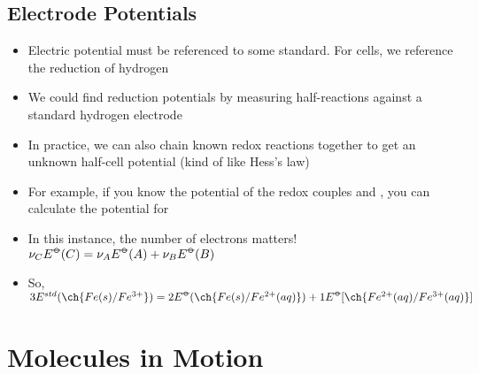 \documentclass[12pt, openany, letterpaper]{memoir}
\begin{document}
\section{Electrode Potentials}
\begin{itemize}
	\item Electric potential must be referenced to some standard. For cells, we reference the reduction of hydrogen
	\item We could find reduction potentials by measuring half-reactions against a standard hydrogen electrode
	\item In practice, we can also chain known redox reactions together to get an unknown half-cell potential (kind of like Hess's law)
	\item For example, if you know the potential of the redox couples  and , you can calculate the potential for 
	\item In this instance, the number of electrons matters! $\nu_CE^{\std}(C) = \nu_AE^{\std}(A) + \nu_BE^{\std}(B)$
	\item So, $3E^{std}(\ch{Fe(s)/Fe^{3+}}) = 2E^{\std}(\ch{Fe(s)/Fe^{2+}(aq)}) + 1E^{\std}[\ch{Fe^{2+}(aq)/Fe^{3+}(aq)}]$
\end{itemize}
\setcounter{chapter}{15}
\chapter{Molecules in Motion}
\end{document}
